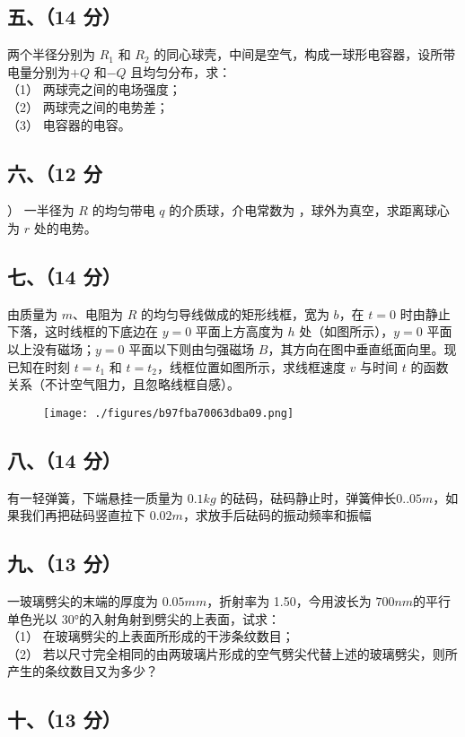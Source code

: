\subsection{五、（14 分）}
两个半径分别为 $R_1$ 和 $R_2$ 的同心球壳，中间是空气，构成一球形电容器，设所带电量分别为$+Q$ 和$-Q$ 且均匀分布，求：\\
（1） 两球壳之间的电场强度；\\
（2） 两球壳之间的电势差；\\
（3） 电容器的电容。
\subsection{六、（12 分}）
一半径为 $R$ 的均匀带电 $q$ 的介质球，介电常数为 ，球外为真空，求距离球心为 $r$ 处的电势。
\subsection{七、（14 分）}
由质量为 $m$、电阻为 $R$ 的均匀导线做成的矩形线框，宽为 $b$，在 $t=0$ 时由静止下落，这时线框的下底边在 $y=0$ 平面上方高度为 $h$ 处（如图所示），$y=0$ 平面以上没有磁场；$y=0$ 平面以下则由匀强磁场 $B$，其方向在图中垂直纸面向里。现已知在时刻 $t=t_1$ 和 $t=t_2$，线框位置如图所示，求线框速度 $v$ 与时间 $t$ 的函数关系（不计空气阻力，且忽略线框自感）。
\begin{figure}[ht]
\centering
\texttt{[image: ./figures/b97fba70063dba09.png]}
\caption{} \label{fig_NJUD5_6}
\end{figure}
\subsection{八、（14 分）}
有一轻弹簧，下端悬挂一质量为 $0.1kg$ 的砝码，砝码静止时，弹簧伸长$0..05m$，如果我们再把砝码竖直拉下 $0.02m$，求放手后砝码的振动频率和振幅
\subsection{九、（13 分）}
一玻璃劈尖的末端的厚度为 $0.05mm$，折射率为 1.50，今用波长为 $700nm$的平行单色光以 30°的入射角射到劈尖的上表面，试求：\\
（1） 在玻璃劈尖的上表面所形成的干涉条纹数目；\\
（2） 若以尺寸完全相同的由两玻璃片形成的空气劈尖代替上述的玻璃劈尖，则所产生的条纹数目又为多少？
\subsection{十、（13 分）}

